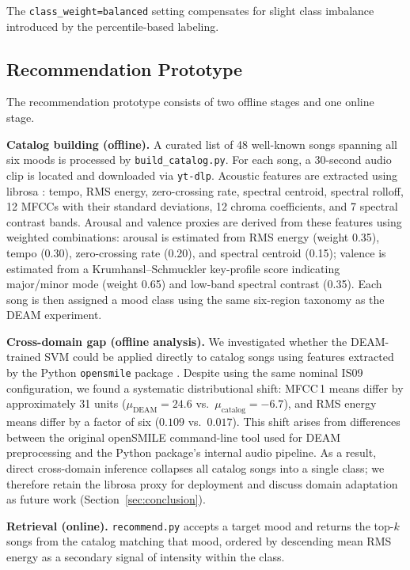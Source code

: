 \documentclass{article}
\begin{document}
The \texttt{class\_weight=balanced} setting compensates for slight class
imbalance introduced by the percentile-based labeling.

\subsection{Recommendation Prototype}

The recommendation prototype consists of two offline stages and one
online stage.

\textbf{Catalog building (offline).}
A curated list of 48 well-known songs spanning all six moods is processed
by \texttt{build\_catalog.py}.
For each song, a 30-second audio clip is located and downloaded via
\texttt{yt-dlp}.
Acoustic features are extracted using librosa \citep{mcfee2015librosa}:
tempo, RMS energy, zero-crossing rate, spectral centroid, spectral rolloff,
12 MFCCs with their standard deviations, 12 chroma coefficients, and 7
spectral contrast bands.
Arousal and valence proxies are derived from these features using weighted
combinations: arousal is estimated from RMS energy (weight 0.35), tempo
(0.30), zero-crossing rate (0.20), and spectral centroid (0.15); valence is
estimated from a Krumhansl--Schmuckler key-profile score
\citep{krumhansl1990cognitive} indicating major/minor mode (weight 0.65)
and low-band spectral contrast (0.35).
Each song is then assigned a mood class using the same six-region taxonomy
as the DEAM experiment.

\textbf{Cross-domain gap (offline analysis).}
We investigated whether the DEAM-trained SVM could be applied directly to
catalog songs using features extracted by the Python \texttt{opensmile}
package \citep{eyben2010opensmile}.
Despite using the same nominal IS09 configuration, we found a systematic
distributional shift: MFCC\,1 means differ by approximately 31 units
($\mu_\text{DEAM}=24.6$ vs.\ $\mu_\text{catalog}=-6.7$), and RMS energy
means differ by a factor of six ($0.109$ vs.\ $0.017$).
This shift arises from differences between the original openSMILE
command-line tool used for DEAM preprocessing and the Python package's
internal audio pipeline.
As a result, direct cross-domain inference collapses all catalog songs into
a single class; we therefore retain the librosa proxy for deployment and
discuss domain adaptation as future work (Section~\ref{sec:conclusion}).

\textbf{Retrieval (online).}
\texttt{recommend.py} accepts a target mood and returns the top-$k$ songs
from the catalog matching that mood, ordered by descending mean RMS energy
as a secondary signal of intensity within the class.
\end{document}
